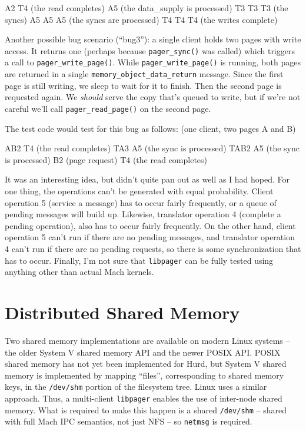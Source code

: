 \documentclass{article}
\def\libpager{{\tt libpager}\xspace}
\def\netmsg{{\tt netmsg}\xspace}
\def\pagersync{{\tt pager_sync()}\xspace}
\def\pagerwritepage{{\tt pager_write_page()}\xspace}
\def\pagerreadpage{{\tt pager_read_page()}\xspace}
\def\moreturn{{\tt memory_object_data_return}\xspace}
\begin{document}
A2 T4 (the read completes) A5 (the data_supply is processed)
    T3 T3 T3 (the syncs) A5 A5 A5 (the syncs are processed) T4 T4 T4 (the writes complete)

Another possible bug scenario (``bug3''): a single client holds two
pages with write access.  It returns one (perhaps because \pagersync
was called) which triggers a call to \pagerwritepage.  While
\pagerwritepage is running, both pages are returned in a single
\moreturn message.  Since the first page is still writing, we
sleep to wait for it to finish.  Then the second page is requested
again.  We {\it should} serve the copy that's queued to write, but if
we're not careful we'll call \pagerreadpage on the second page.

The test code would test for this bug as follows: (one client, two pages A and B)

AB2 T4 (the read completes) TA3 A5 (the sync is processed) TAB2 A5 (the sync is processed)
B2 (page request) T4 (the read completes)

It was an interesting idea, but didn't quite pan out as well as I had
hoped.  For one thing, the operations can't be generated with equal
probability.  Client operation 5 (service a message) has to occur
fairly frequently, or a queue of pending messages will build up.
Likewise, translator operation 4 (complete a pending operation), also
has to occur fairly frequently.  On the other hand, client operation 5
can't run if there are no pending messages, and translator operation 4
can't run if there are no pending requests, so there is some
synchronization that has to occur.  Finally, I'm not sure that
\libpager can be fully tested using anything other than actual Mach
kernels.

\section{Distributed Shared Memory}

Two shared memory implementations are available on modern Linux
systems -- the older System V shared memory API and the newer POSIX
API.  POSIX shared memory has not yet been implemented for Hurd, but
System V shared memory is implemented by mapping ``files'',
corresponding to shared memory keys, in the {\tt /dev/shm} portion of
the filesystem tree.  Linux uses a similar approach.  Thus, a
multi-client \libpager enables the use of inter-node shared memory.
What is required to make this happen is a shared {\tt /dev/shm} --
shared with full Mach IPC semantics, not just NFS -- so \netmsg is
required.
\end{document}
